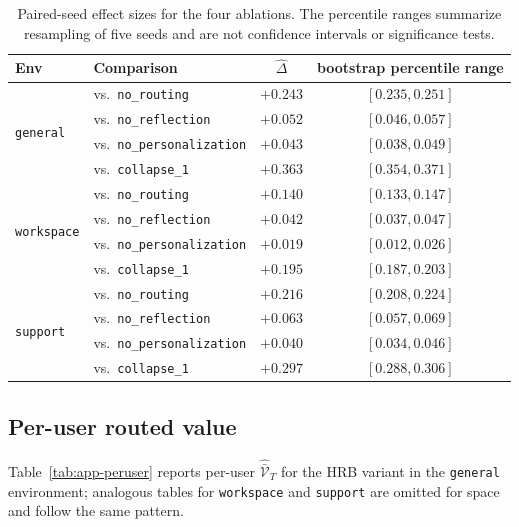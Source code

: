 \documentclass{article} %
\begin{document}
\begin{table}[h]
\centering
\small
\begin{tabular}{llcc}
\toprule
Env & Comparison & $\widehat\Delta$ & bootstrap percentile range \\
\midrule
\multirow{4}{*}{\texttt{general}}
 & vs.\ \texttt{no\_routing}         & $+0.243$ & $[0.235, 0.251]$ \\
 & vs.\ \texttt{no\_reflection}      & $+0.052$ & $[0.046, 0.057]$ \\
 & vs.\ \texttt{no\_personalization} & $+0.043$ & $[0.038, 0.049]$ \\
 & vs.\ \texttt{collapse\_1}         & $+0.363$ & $[0.354, 0.371]$ \\
\midrule
\multirow{4}{*}{\texttt{workspace}}
 & vs.\ \texttt{no\_routing}         & $+0.140$ & $[0.133, 0.147]$ \\
 & vs.\ \texttt{no\_reflection}      & $+0.042$ & $[0.037, 0.047]$ \\
 & vs.\ \texttt{no\_personalization} & $+0.019$ & $[0.012, 0.026]$ \\
 & vs.\ \texttt{collapse\_1}         & $+0.195$ & $[0.187, 0.203]$ \\
\midrule
\multirow{4}{*}{\texttt{support}}
 & vs.\ \texttt{no\_routing}         & $+0.216$ & $[0.208, 0.224]$ \\
 & vs.\ \texttt{no\_reflection}      & $+0.063$ & $[0.057, 0.069]$ \\
 & vs.\ \texttt{no\_personalization} & $+0.040$ & $[0.034, 0.046]$ \\
 & vs.\ \texttt{collapse\_1}         & $+0.297$ & $[0.288, 0.306]$ \\
\bottomrule
\end{tabular}
\caption{Paired-seed effect sizes for the four ablations. The percentile ranges
summarize resampling of five seeds and are not confidence intervals or
significance tests.}
\label{tab:app-bootstrap}
\end{table}

\subsection{Per-user routed value}

\label{app:tab-peruser}

Table~\ref{tab:app-peruser} reports per-user $\widehat{\bar{\mathcal V}}_T$ for the \textnormal{HRB} variant in the \texttt{general} environment; analogous tables for \texttt{workspace} and \texttt{support} are omitted for space and follow the same pattern.
\end{document}
